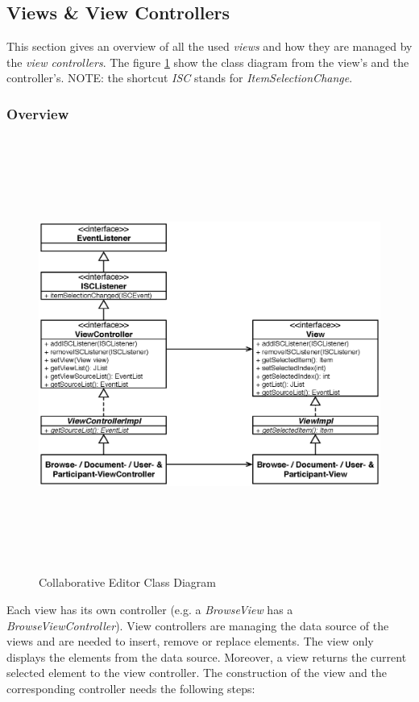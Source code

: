 \subsection{Views \& View Controllers}
This section gives an overview of all the used \textit{views} and how they are managed by the \textit{view controllers}. The figure \ref{application_views_controllers} show the class diagram from the view's and the controller's. NOTE: the shortcut \textit{ISC} stands for \textit{ItemSelectionChange}.
\subsubsection{Overview}
\begin{figure}[H]
\begin{center}
  \includegraphics[height=5.62in, width=7.19in]{../images/finalreport/application_views_controllers.eps}
\caption{Collaborative Editor Class Diagram}
\label{application_views_controllers}
\end{center}
\end{figure}
Each view has its own controller (e.g. a \textit{BrowseView} has a \textit{BrowseViewController}). View controllers are managing the data source of the views and are needed to insert, remove or replace elements. The view only displays the elements from the data source. Moreover, a view returns the current selected element to the view controller. The construction of the view and the corresponding controller needs the following steps:
